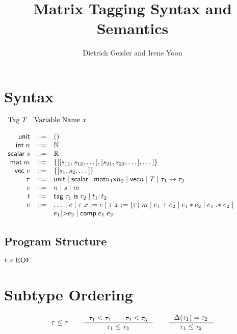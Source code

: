 \documentclass{article}
\begin{document}
\newcommand{\mat}{\mathsf{mat}n_1\textnormal{x}n_2}
\newcommand{\env}[1]{\langle#1,\sigma\rangle}

\mathlig{->}{\rightarrow}
\mathlig{|-}{\vdash}
\mathlig{=>}{\Rightarrow}
\mathligson

\title{Matrix Tagging Syntax and Semantics}
\author{Dietrich Geisler and Irene Yoon}

\section{Syntax}

$\begin{array}{cc}
\textnormal{Tag }T&\textnormal{Variable Name }x
\end{array}
$

$\begin{array}{rcl}
\mathsf{unit}&::=&()\\
\mathsf{int}\;n&::=&\mathbb{N}\\
\mathsf{scalar}\;s&::=&\mathbb{R}\\
\mathsf{mat}\;m&::=&\{[[s_{11},s_{12},\dots],[s_{21},s_{22},\dots],\dots]\}\\
\mathsf{vec}\;v&::=&\{[s_1,s_2,\dots]\}\\
\tau&::=&\mathsf{unit}\;|\;\mathsf{scalar}\;|\;\mathsf{mat}n_1\mathsf{x}n_2\;|\;\mathsf{vec}n\;|\;T\;|\;\tau_1->\tau_2\\
c&::=&n\;|\;s\;|\;m\\
t&::=&\mathsf{tag}\;\tau_1\;\mathsf{is}\;\tau_2\;|\;t_1;t_2\\
e&::=&\dots\;|\;c\;|\;\tau\;x:=e\;|\;\tau\;x:=(\tau)\;m\;|\;e_1+e_2\;|\;e_1*e_2\;|\;e_1\;\mathsf{.*}\;e_2\;|\\
&&e_1\textnormal{|>}e_2\;|\;\mathsf{comp}\;e_1\;e_2
\end{array}$

\subsection{Program Structure}
$t;e\;\textnormal{EOF}$\\

\section{Subtype Ordering}

\[
\tau\leq\tau
\qquad
\inference[]{\tau_1\leq\tau_2\qquad\tau_2\leq\tau_3}{\tau_1\leq\tau_3}
\qquad
\inference[]{\Delta(\tau_1)=\tau_2}{\tau_1\leq\tau_2}
\]
\end{document}
